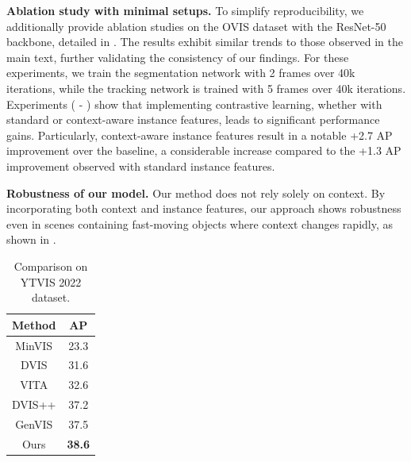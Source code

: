 \documentclass[10pt,twocolumn,letterpaper]{article}
\begin{document}
\textbf{Ablation study with minimal setups.}
To simplify reproducibility, we additionally provide ablation studies on the OVIS dataset \citep{qi2022occluded} with the ResNet-50 \citep{he2016deep} backbone, detailed in . The results exhibit similar trends to those observed in the main text, further validating the consistency of our findings. For these experiments, we train the segmentation network with 2 frames over 40k iterations, while the tracking network is trained with 5 frames over 40k iterations. Experiments ( - ) show that implementing contrastive learning, whether with standard or context-aware instance features, leads to significant performance gains. Particularly, context-aware instance features result in a notable +2.7 AP improvement over the baseline, a considerable increase compared to the +1.3 AP improvement observed with standard instance features.




\textbf{Robustness of our model.}
Our method does not rely solely on context. By incorporating both context and instance features, our approach shows robustness even in scenes containing fast-moving objects where context changes rapidly, as shown in . 









\newlength{\oldintextsep}
\setlength{\oldintextsep}{\intextsep}

\setlength\intextsep{0pt}
\begin{table}
\scriptsize{
\begin{tabular}{c|c}
\toprule
Method & AP \\ \hline
MinVIS \citep{huang2022minvis} & 23.3 \\
DVIS \citep{DVIS} & 31.6 \\
VITA \citep{heo2022vita} & 32.6 \\
DVIS++ \citep{zhang2023dvis++} & 37.2 \\
GenVIS \citep{heo2023generalized} & 37.5 \\
Ours & \textbf{38.6}\\ \bottomrule
\end{tabular}}
\caption{Comparison on YTVIS 2022 dataset.}
\label{tab:ytvis22}
\end{table}
\end{document}

